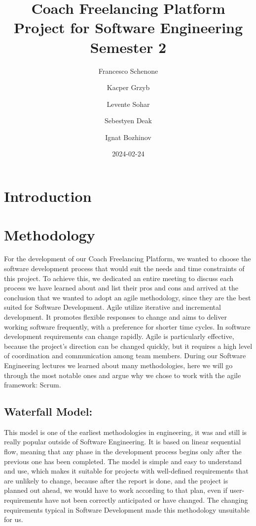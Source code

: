 \documentclass[12pt]{report}
\title{Coach Freelancing Platform Project for Software Engineering Semester 2}
\author{Francesco Schenone \and Kacper Grzyb \and Levente Sohar \and Sebestyen Deak \and Ignat Bozhinov}
\date{2024-02-24}
\begin{document}
\maketitle
\section{Introduction}
\section{Methodology}

For the development of our Coach Freelancing Platform, we wanted to choose the software development process that would suit the needs and time constraints of this project. To achieve this, we dedicated an entire meeting to discuss each process we have learned about and list their pros and cons and arrived at the conclusion that we wanted to adopt an agile methodology, since they are the best suited for Software Development. Agile utilize iterative and incremental development. It promotes flexible responses to change and aims to deliver working software frequently, with a preference for shorter time cycles. In software development requirements can change rapidly. Agile is particularly effective, because the project's direction can be changed quickly, but it requires a high level of coordination and communication among team members.
During our Software Engineering lectures we learned about many methodologies, here we will go through the most notable ones and argue why we chose to work with the agile framework: Scrum.

\subsection*{Waterfall Model:}
This model is one of the earliest methodologies in engineering, it was and still is really popular outside of Software Engineering. It is based on linear sequential flow, meaning that any phase in the development process begins only after the previous one has been completed. The model is simple and easy to understand and use, which makes it suitable for projects with well-defined requirements that are unlikely to change, because after the report is done, and the project is planned out ahead, we would have to work according to that plan, even if user-requirements have not been correctly anticipated or have changed. The changing requirements typical in Software Development made this methodology unsuitable for us. 
\end{document}

